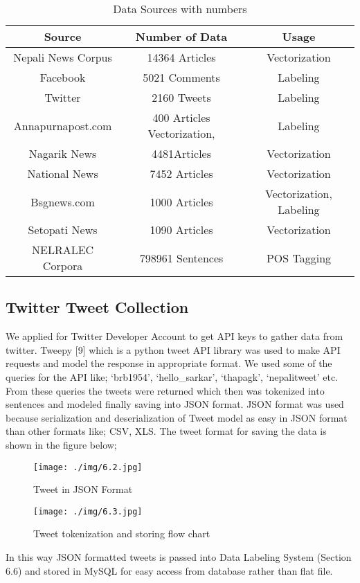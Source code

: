     \begin{table}[h]
        \caption{Data Sources with numbers}
        \begin{tabular}{|c|c|c|}
            \hline
            \textbf{Source} & \textbf{Number of Data}  & \textbf{Usage} \\\hline
            Nepali News Corpus & 14364 Articles  & Vectorization\\\hline
            Facebook & 5021 Comments & Labeling\\\hline
            Twitter & 2160 Tweets & Labeling\\\hline
            Annapurnapost.com & 400 Articles Vectorization, & Labeling\\\hline
            Nagarik News & 4481Articles & Vectorization\\\hline
            National News & 7452 Articles & Vectorization\\\hline
            Bsgnews.com & 1000 Articles & Vectorization, Labeling\\\hline
            Setopati News & 1090 Articles & Vectorization\\\hline
            NELRALEC Corpora & 798961 Sentences & POS Tagging\\\hline
        \end{tabular}
    \end{table}

            \subsection{Twitter Tweet Collection}
We applied for Twitter Developer Account to get API keys to gather data from twitter.
Tweepy
[9]
which is a python tweet API library was used to make API requests and
model the response in appropriate format. We used some of the queries for the API like;
‘brb1954’, ‘hello_sarkar’, ‘thapagk’, ‘nepalitweet’ etc. From these queries the tweets
were returned which then was tokenized into sentences and modeled finally saving into
JSON format. JSON format was used because serialization and deserialization of Tweet
model as easy in JSON format than other formats like; CSV, XLS. The tweet format
for saving the data is shown in the figure below;

        \begin{figure}[hbt!]
            \centering
             \texttt{[image: ./img/6.2.jpg]}
                \caption{Tweet in JSON Format}
        \end{figure}
        \begin{figure}[hbt!]
            \centering
             \texttt{[image: ./img/6.3.jpg]}
                \caption{Tweet tokenization and storing flow chart}
        \end{figure}
In this way JSON formatted tweets is passed into Data Labeling System (Section 6.6)
and stored in MySQL for easy access from database rather than flat file.
